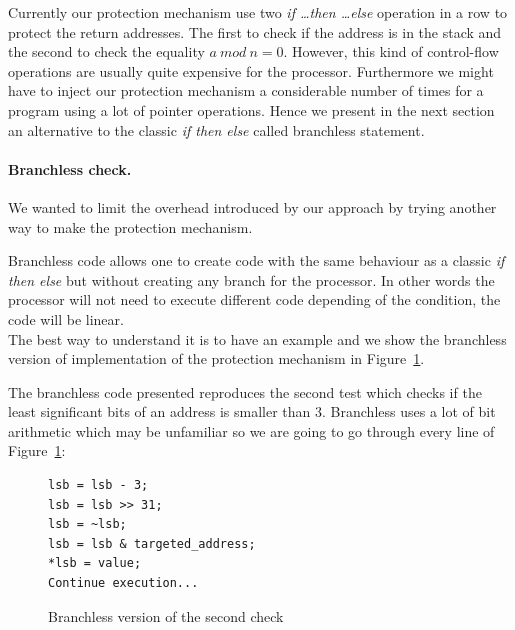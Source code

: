 \documentclass[11pt]{sdm}
\begin{document}
Currently our protection mechanism use two \textit{if \dots then \dots else} operation in a row to protect the return addresses. The first to check if the address is in the stack and the second to check the equality $a~mod~n=0$.
However, this kind of control-flow operations are usually quite expensive for the processor. Furthermore we might have to inject our protection mechanism a considerable number of times for a program using a lot of pointer operations.
Hence we present in the next section an alternative to the classic \textit{if then else} called branchless statement.

\paragraph{Branchless check.}
\label{par:Branchless check}

We wanted to limit the overhead introduced by our approach by trying another way to make the protection mechanism. 

Branchless code allows one to create code with the same behaviour as a classic \textit{if then else} but without creating any branch for the processor. In other words the processor will not need to execute different code depending of the condition, the code will be linear.\\
The best way to understand it is to have an example and we show the branchless version of implementation of the protection mechanism in Figure~\ref{branchless}.

The branchless code presented reproduces the second test which checks if the least significant bits of an address is smaller than 3. Branchless uses a lot of bit arithmetic which may be unfamiliar so we are going to go through every line of Figure~\ref{branchless}:

\begin{figure}[!ht]
\centering
\begin{lstlisting}
lsb = lsb - 3;
lsb = lsb >> 31;
lsb = ~lsb;
lsb = lsb & targeted_address;
*lsb = value;
Continue execution...
\end{lstlisting}
\caption{Branchless version of the second check}
\label{branchless}
\end{figure}
\end{document}
